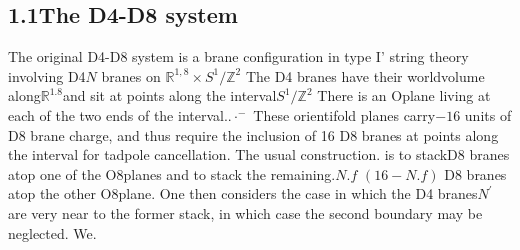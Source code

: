 \documentclass{article}
\begin{document}
\subsection*{1.1The D4-D8 system}


The original D4-D8 system is a brane configuration in type I' string theory involving D4$N$
branes on $\mathbb { R } ^ { 1, 8 } \times S ^ { 1 } / \mathbb { Z } ^ { 2 }$  The D4 branes have their worldvolume along$\mathbb { R } ^ { 1. 8 }$and sit at points
along the interval$S ^ { 1 } / \mathbb { Z } ^ { 2 }$ There is an Oplane living at each of the two ends of the interval..$\cdot ^ { - }$
These orientifold planes carry$- 1 6$ units of D8 brane charge, and thus require the inclusion
of 16 D8 branes at points along the interval for tadpole cancellation. The usual construction.
is to stackD8 branes atop one of the O8planes and to stack the remaining.$N . { f }$ $( 1 6 - N . { f } )$
D8 branes atop the other O8plane. One then considers the case in which the D4 branes$N ^ { \prime }$
are very near to the former stack, in which case the second boundary may be neglected. We.
\end{document}
